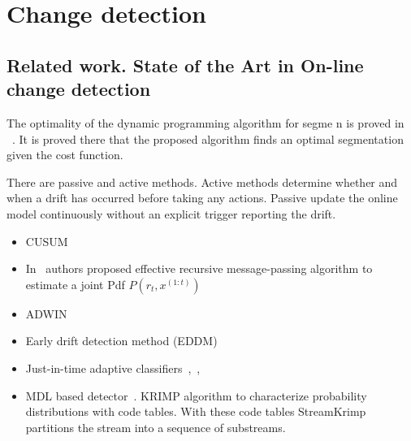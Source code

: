 \chapter{Change detection}  %
\section{Related work. State of the Art in On-line change detection}

The optimality of the dynamic programming
algorithm for segme n is proved in
~\cite{Jackson2005}. It is proved there that the
proposed algorithm finds an optimal segmentation
given the cost function.

There are passive and active methods.  Active
methods determine whether and when a drift has
occurred before taking any actions.  Passive
update the online model continuously without an
explicit trigger reporting the drift.

\begin{itemize}
	\item CUSUM~\cite{Page1954}
	
	\item In~\cite{mackay2007} authors proposed effective recursive message-passing algorithm to estimate a joint Pdf $P(r_t, x^{(1:t)})$
	
	\item ADWIN~\cite{bifet2007learning}
	
	\item Early drift detection method (EDDM)~\cite{baena2006early}
	
	\item Just-in-time adaptive classifiers~\cite{alippi2008just},~\cite{alippi2008just2},~\cite{AlippiRecConcept}
	
	\item MDL based detector~\cite{StreamKrimp}. KRIMP algorithm to characterize probability distributions with code tables. With these code tables StreamKrimp partitions the stream into a sequence of substreams.
\end{itemize}

~\cite{Widmer1996}



